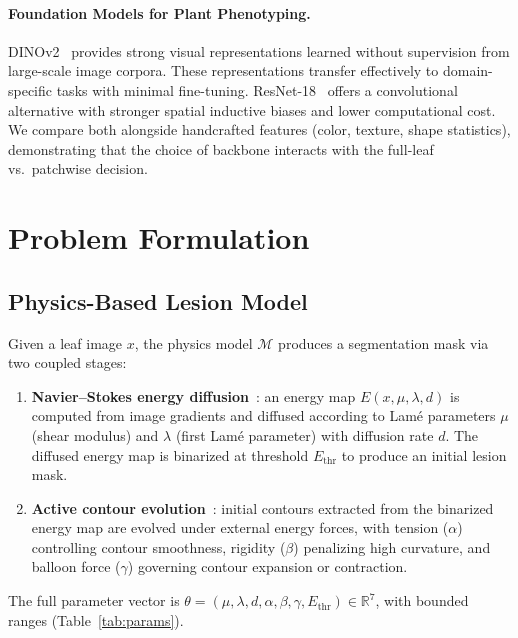 \documentclass[11pt,a4paper]{article}
\begin{document}
\paragraph{Foundation Models for Plant Phenotyping.}
DINOv2~\citep{oquab2024dinov2} provides strong visual representations learned without supervision from large-scale image corpora.
These representations transfer effectively to domain-specific tasks with minimal fine-tuning.
ResNet-18~\citep{he2016resnet} offers a convolutional alternative with stronger spatial inductive biases and lower computational cost.
We compare both alongside handcrafted features (color, texture, shape statistics), demonstrating that the choice of backbone interacts with the full-leaf vs.\ patchwise decision.


\section{Problem Formulation}
\label{sec:formulation}

\subsection{Physics-Based Lesion Model}

Given a leaf image $x$, the physics model $\mathcal{M}$ produces a segmentation mask via two coupled stages:
\begin{enumerate}[nosep]
    \item \textbf{Navier--Stokes energy diffusion}~\citep{navier1823memoire}: an energy map $E(x, \mu, \lambda, d)$ is computed from image gradients and diffused according to Lam\'{e} parameters $\mu$ (shear modulus) and $\lambda$ (first Lam\'{e} parameter) with diffusion rate $d$. The diffused energy map is binarized at threshold $E_\mathrm{thr}$ to produce an initial lesion mask.
    \item \textbf{Active contour evolution}~\citep{kass1988snakes}: initial contours extracted from the binarized energy map are evolved under external energy forces, with tension ($\alpha$) controlling contour smoothness, rigidity ($\beta$) penalizing high curvature, and balloon force ($\gamma$) governing contour expansion or contraction.
\end{enumerate}
The full parameter vector is $\theta = (\mu, \lambda, d, \alpha, \beta, \gamma, E_\mathrm{thr}) \in \mathbb{R}^7$, with bounded ranges (Table~\ref{tab:params}).
\end{document}
